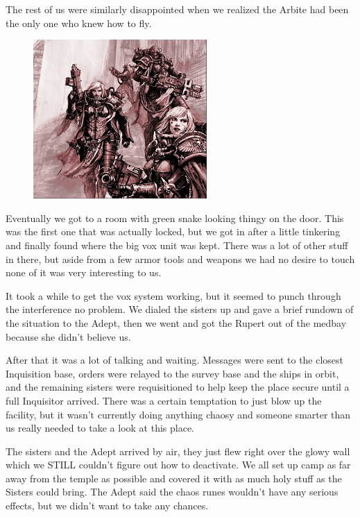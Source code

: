 The rest of us were similarly disappointed when we realized the Arbite had been the only one who knew how to fly.

\begin{figure}
	\begin{center}
		\includegraphics[width=\figwidth]{pics/6/52.png}
	\end{center}
\end{figure}
Eventually we got to a room with green snake looking thingy on the door. 
This was the first one that was actually locked, but we got in after a little tinkering and finally found where the big vox unit was kept. 
There was a lot of other stuff in there, but aside from a few armor tools and weapons we had no desire to touch none of it was very interesting to us.

It took a while to get the vox system working, but it seemed to punch through the interference no problem. 
We dialed the sisters up and gave a brief rundown of the situation to the Adept, then we went and got the Rupert out of the medbay because she didn't believe us. 

After that it was a lot of talking and waiting. 
Messages were sent to the closest Inquisition base, orders were relayed to the survey base and the ships in orbit, and the remaining sisters were requisitioned to help keep the place secure until a full Inquisitor arrived. 
There was a certain temptation to just blow up the facility, but it wasn't currently doing anything chaosy and someone smarter than us really needed to take a look at this place.

The sisters and the Adept arrived by air, they just flew right over the glowy wall which we STILL couldn't figure out how to deactivate. 
We all set up camp as far away from the temple as possible and covered it with as much holy stuff as the Sisters could bring. 
The Adept said the chaos runes wouldn't have any serious effects, but we didn't want to take any chances.

